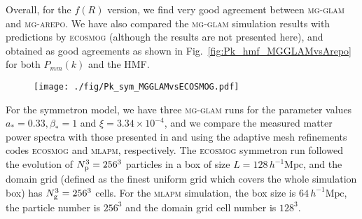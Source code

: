 Overall, for the $f(R)$ version, we find very good agreement between \textsc{mg-glam} and \textsc{mg-arepo}. We have also compared the \textsc{mg-glam} simulation results with predictions by \textsc{ecosmog} (although the results are not presented here), and obtained as good agreements as shown in Fig.~\ref{fig:Pk_hmf_MGGLAMvsArepo} for both $P_{mm}(k)$ and the HMF.



\begin{figure}
    \centering 
    \texttt{[image: ./fig/Pk\_sym\_MGGLAMvsECOSMOG.pdf]}
    \caption{}
    \label{fig:Pk_sym_MGGLAMvsECOSMOG}
\end{figure}


For the symmetron model, we have three \textsc{mg-glam} runs for the parameter values $a_\ast=0.33, \beta_\ast=1$ and $\xi = 3.34 \times 10^{-4}$, and we compare the measured matter power spectra with those presented in \citep{2012JCAP...10..002B} and \citep{2012ApJ...756..166W} using the adaptive mesh refinements codes \textsc{ecosmog} and \textsc{mlapm}, respectively.
The \textsc{ecosmog} symmetron run followed the evolution of  $N_{\rm p}^3 = 256^3$ particles in a box of size $L = 128 \, h^{-1}\mathrm{Mpc}$, and the domain grid (defined as the finest uniform grid which covers the whole simulation box) has $N_{\rm g}^3 = 256^3$ cells. For the \textsc{mlapm} simulation, the box size is $64 \, h^{-1} \mathrm{Mpc}$, the particle number is $256^3$ and the domain grid cell number is $128^3$. 

